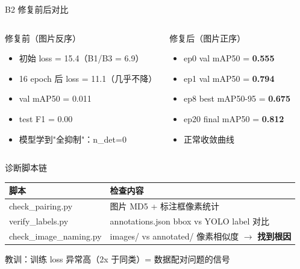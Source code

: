 \documentclass[aspectratio=169, 10pt]{beamer}
\begin{document}
\begin{frame}{B2 修复前后对比}
  \begin{columns}[T]
    \begin{alertblock}{修复前（图片反序）}
      \begin{itemize}
        \item 初始 loss = \alert{15.4}（B1/B3 = 6.9）
        \item 16 epoch 后 loss = 11.1（几乎不降）
        \item val mAP50 = \alert{0.011}
        \item test F1 = \alert{0.00}
        \item 模型学到"全抑制"：n\_det=0
      \end{itemize}
    \end{alertblock}
    \begin{block}{修复后（图片正序）}
      \begin{itemize}
        \item ep0 val mAP50 = \textbf{0.555}
        \item ep1 val mAP50 = \textbf{0.794}
        \item ep8 best mAP50-95 = \textbf{0.675}
        \item ep20 final mAP50 = \textbf{0.812}
        \item 正常收敛曲线
      \end{itemize}
    \end{block}
  \end{columns}
  \vspace{0em}
  \begin{block}{诊断脚本链}
    \begin{tabular}{p{3.5cm}p{8cm}}
      \toprule
      \textbf{脚本} & \textbf{检查内容} \\
      \midrule
      check\_pairing.py & 图片 MD5 + 标注框像素统计 \\
      verify\_labels.py & annotations.json bbox vs YOLO label 对比 \\
      check\_image\_naming.py & images/ vs annotated/ 像素相似度 $\to$ \textbf{找到根因} \\
      \bottomrule
    \end{tabular}
  \end{block}
  \vspace{0em}
  \begin{alertblock}{教训：训练 loss 异常高（2x 于同类）= 数据配对问题的信号}
  \end{alertblock}
\end{frame}
\end{document}
